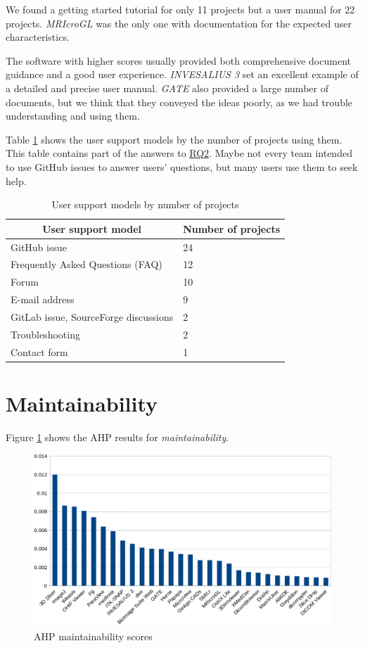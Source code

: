 We found a getting started tutorial for only 11 projects but a user manual for 22 projects. \textit{MRIcroGL} was the only one with documentation for the expected user characteristics.

The software with higher scores usually provided both comprehensive document guidance and a good user experience. \textit{INVESALIUS 3} set an excellent example of a detailed and precise user manual. \textit{GATE} also provided a large number of documents, but we think that they conveyed the ideas poorly, as we had trouble understanding and using them.
 
Table \ref{tab_user_support_model} shows the user support models by the number of projects using them. This table contains part of the answers to \hyperlink{rq2}{RQ2}. Maybe not every team intended to use GitHub issues to answer users' questions, but many users use them to seek help.

\begin{table}[H]
\centering
\begin{tabular}{ll}
\hline
\multicolumn{1}{c}{User support model} & Number of projects \\ \hline
GitHub issue & 24 \\
Frequently Asked Questions (FAQ) & 12 \\
Forum & 10 \\
E-mail address & 9 \\
GitLab issue, SourceForge discussions & 2 \\
Troubleshooting & 2 \\
Contact form & 1 \\ \hline
\end{tabular}
\caption{\label{tab_user_support_model}User support models by number of projects}
\end{table}

\section{Maintainability}
\label{sec_score_maintainability}
Figure \ref{fg_maintainability_scores} shows the AHP results for \textit{maintainability}. 

\begin{figure}[H]
\includegraphics[scale=0.38]{figures/maintainability_scores.png}
\caption{AHP maintainability scores}
\label{fg_maintainability_scores}
\end{figure}

